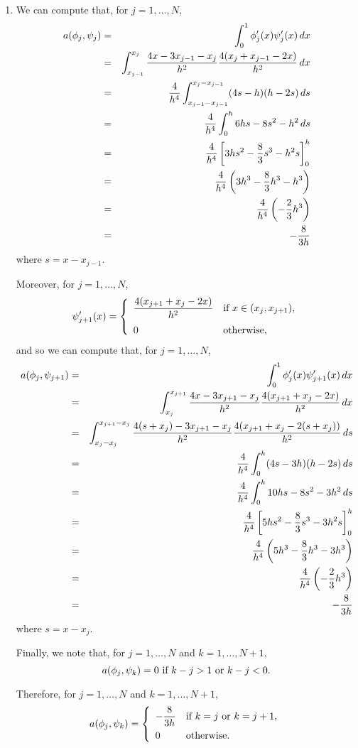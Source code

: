 \begin{solution}
\begin{enumerate}
\begin{enumerate}
\item We can compute that, for $j=1,\ldots,N$,
\begin{eqnarray*}
a(\phi_j,\psi_j)&=&\int_0^1\phi_j'(x)\psi_j'(x)\,dx
\\
&=&\int_{x_{j-1}}^{x_j}{4x-3x_{j-1}-x_j \over h^2}{4(x_j+x_{j-1}-2x) \over h^2}\,dx
\\
&=&{4 \over h^4}\int_{x_{j-1}-x_{j-1}}^{x_j-x_{j-1}}(4s-h)(h-2s)\,ds
\\
&=&{4 \over h^4}\int_0^h6hs-8s^2-h^2\,ds
\\
&=&{4 \over h^4}\left[3hs^2-{8 \over 3}s^3-h^2s\right]_0^h
\\
&=&{4 \over h^4}\left(3h^3-{8 \over 3}h^3-h^3\right)
\\
&=&{4 \over h^4}\left(-{2 \over 3}h^3\right)
\\
&=&-{8 \over 3h}
\end{eqnarray*}
where $s=x-x_{j-1}$.

Moreover, for $j=1,\ldots,N$,
\[
\psi_{j+1}'(x)=\left\{\begin{array}{ll}
\displaystyle{{4(x_{j+1}+x_j-2x) \over h^2}} & \displaystyle{\mbox{if }x\in(x_j,x_{j+1})},
\\[10pt]
0 & \mbox{otherwise},
\end{array}\right.
\]
and so we can compute that, for $j=1,\ldots,N$,
\begin{eqnarray*}
a(\phi_j,\psi_{j+1})&=&\int_0^1\phi_j'(x)\psi_{j+1}'(x)\,dx
\\
&=&\int_{x_j}^{x_{j+1}}{4x-3x_{j+1}-x_j \over h^2}{4(x_{j+1}+x_j-2x) \over h^2}\,dx
\\
&=&\int_{x_j-x_j}^{x_{j+1}-x_j}{4(s+x_j)-3x_{j+1}-x_j \over h^2}{4(x_{j+1}+x_j-2(s+x_j)) \over h^2}\,ds
\\
&=&{4 \over h^4}\int_0^h(4s-3h)(h-2s)\,ds
\\
&=&{4 \over h^4}\int_0^h10hs-8s^2-3h^2\,ds
\\
&=&{4 \over h^4}\left[5hs^2-{8 \over 3}s^3-3h^2s\right]_0^h
\\
&=&{4 \over h^4}\left(5h^3-{8 \over 3}h^3-3h^3\right)
\\
&=&{4 \over h^4}\left(-{2 \over 3}h^3\right)
\\
&=&-{8 \over 3h}
\end{eqnarray*}
where $s=x-x_j$.

Finally, we note that, for $j=1,\ldots,N$ and $k=1,\ldots,N+1$,
\[
a(\phi_j,\psi_k)=0\mbox{ if }k-j>1\mbox{ or }k-j<0.
\]

Therefore, for $j=1,\ldots,N$ and $k=1,\ldots,N+1$,
\[
a(\phi_j,\psi_k)=\left\{\begin{array}{ll}\displaystyle{-{8 \over 3h}} & \mbox{if }k=j\mbox{ or }k=j+1, \\[.75em] \displaystyle{0} & \mbox{otherwise}.\end{array}\right.
\]
\end{enumerate}
\end{enumerate}
\end{solution}

